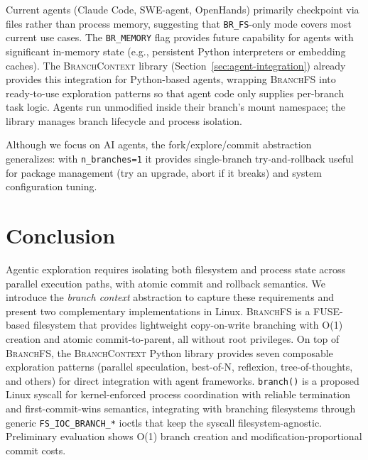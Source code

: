 \documentclass[sigconf]{acmart}
\newcommand{\sys}{\textsc{BranchFS}\xspace}
\newcommand{\syscall}{\texttt{branch()}\xspace}
\begin{document}
Current agents (Claude Code, SWE-agent, OpenHands) primarily checkpoint via files rather than process memory, suggesting that \texttt{BR\_FS}-only mode covers most current use cases. The \texttt{BR\_MEMORY} flag provides future capability for agents with significant in-memory state (e.g., persistent Python interpreters or embedding caches). The \textsc{BranchContext} library (Section~\ref{sec:agent-integration}) already provides this integration for Python-based agents, wrapping \sys into ready-to-use exploration patterns so that agent code only supplies per-branch task logic. Agents run unmodified inside their branch's mount namespace; the library manages branch lifecycle and process isolation.

Although we focus on AI agents, the fork/explore/commit abstraction generalizes: with \texttt{n\_branches=1} it provides single-branch try-and-rollback useful for package management (try an upgrade, abort if it breaks) and system configuration tuning.

\section{Conclusion}

Agentic exploration requires isolating both filesystem and process state across parallel execution paths, with atomic commit and rollback semantics. We introduce the \emph{branch context} abstraction to capture these requirements and present two complementary implementations in Linux. \sys is a FUSE-based filesystem that provides lightweight copy-on-write branching with O(1) creation and atomic commit-to-parent, all without root privileges. On top of \sys, the \textsc{BranchContext} Python library provides seven composable exploration patterns (parallel speculation, best-of-N, reflexion, tree-of-thoughts, and others) for direct integration with agent frameworks. \syscall is a proposed Linux syscall for kernel-enforced process coordination with reliable termination and first-commit-wins semantics, integrating with branching filesystems through generic \texttt{FS\_IOC\_BRANCH\_*} ioctls that keep the syscall filesystem-agnostic. Preliminary evaluation shows O(1) branch creation and modification-proportional commit costs.



\end{document}
